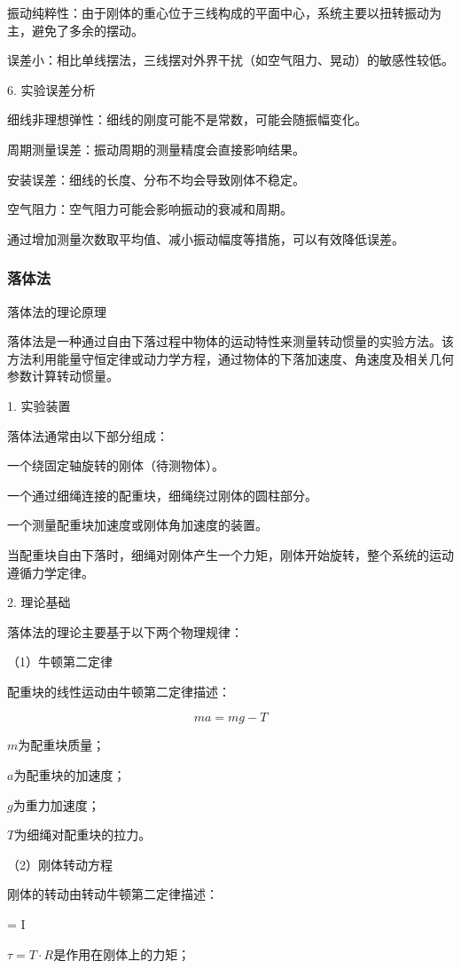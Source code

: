 \documentclass[12pt,hyperref,a4paper,UTF8]{ctexart}
\begin{document}
振动纯粹性：由于刚体的重心位于三线构成的平面中心，系统主要以扭转振动为主，避免了多余的摆动。

误差小：相比单线摆法，三线摆对外界干扰（如空气阻力、晃动）的敏感性较低。


6. 实验误差分析

细线非理想弹性：细线的刚度可能不是常数，可能会随振幅变化。

周期测量误差：振动周期的测量精度会直接影响结果。

安装误差：细线的长度、分布不均会导致刚体不稳定。

空气阻力：空气阻力可能会影响振动的衰减和周期。


通过增加测量次数取平均值、减小振动幅度等措施，可以有效降低误差。

\subsubsection{落体法}

落体法的理论原理

落体法是一种通过自由下落过程中物体的运动特性来测量转动惯量的实验方法。该方法利用能量守恒定律或动力学方程，通过物体的下落加速度、角速度及相关几何参数计算转动惯量。

1. 实验装置

落体法通常由以下部分组成：

一个绕固定轴旋转的刚体（待测物体）。

一个通过细绳连接的配重块，细绳绕过刚体的圆柱部分。

一个测量配重块加速度或刚体角加速度的装置。


当配重块自由下落时，细绳对刚体产生一个力矩，刚体开始旋转，整个系统的运动遵循力学定律。

2. 理论基础

落体法的理论主要基于以下两个物理规律：

（1）牛顿第二定律

配重块的线性运动由牛顿第二定律描述：

$$ ma = mg - T $$

 $m$为配重块质量；

 $a$为配重块的加速度；

 $g$为重力加速度；

 $T$为细绳对配重块的拉力。


（2）刚体转动方程

刚体的转动由转动牛顿第二定律描述：

\tau = I \alpha

 $\tau=T\cdot R$是作用在刚体上的力矩；
\end{document}
